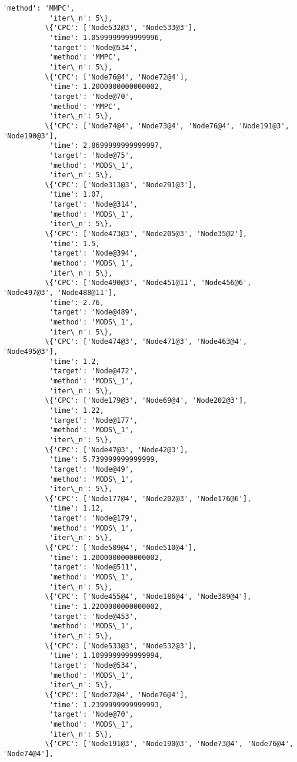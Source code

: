 \documentclass[11pt]{article}
\begin{document}
\begin{Verbatim}[commandchars=\\\{\}]
           'method': 'MMPC',
           'iter\_n': 5\},
          \{'CPC': ['Node532@3', 'Node533@3'],
           'time': 1.0599999999999996,
           'target': 'Node@534',
           'method': 'MMPC',
           'iter\_n': 5\},
          \{'CPC': ['Node76@4', 'Node72@4'],
           'time': 1.2000000000000002,
           'target': 'Node@70',
           'method': 'MMPC',
           'iter\_n': 5\},
          \{'CPC': ['Node74@4', 'Node73@4', 'Node76@4', 'Node191@3', 'Node190@3'],
           'time': 2.8699999999999997,
           'target': 'Node@75',
           'method': 'MODS\_1',
           'iter\_n': 5\},
          \{'CPC': ['Node313@3', 'Node291@3'],
           'time': 1.07,
           'target': 'Node@314',
           'method': 'MODS\_1',
           'iter\_n': 5\},
          \{'CPC': ['Node473@3', 'Node205@3', 'Node35@2'],
           'time': 1.5,
           'target': 'Node@394',
           'method': 'MODS\_1',
           'iter\_n': 5\},
          \{'CPC': ['Node490@3', 'Node451@11', 'Node456@6', 'Node497@3', 'Node488@11'],
           'time': 2.76,
           'target': 'Node@489',
           'method': 'MODS\_1',
           'iter\_n': 5\},
          \{'CPC': ['Node474@3', 'Node471@3', 'Node463@4', 'Node495@3'],
           'time': 1.2,
           'target': 'Node@472',
           'method': 'MODS\_1',
           'iter\_n': 5\},
          \{'CPC': ['Node179@3', 'Node69@4', 'Node202@3'],
           'time': 1.22,
           'target': 'Node@177',
           'method': 'MODS\_1',
           'iter\_n': 5\},
          \{'CPC': ['Node47@3', 'Node42@3'],
           'time': 5.739999999999999,
           'target': 'Node@49',
           'method': 'MODS\_1',
           'iter\_n': 5\},
          \{'CPC': ['Node177@4', 'Node202@3', 'Node176@6'],
           'time': 1.12,
           'target': 'Node@179',
           'method': 'MODS\_1',
           'iter\_n': 5\},
          \{'CPC': ['Node509@4', 'Node510@4'],
           'time': 1.2000000000000002,
           'target': 'Node@511',
           'method': 'MODS\_1',
           'iter\_n': 5\},
          \{'CPC': ['Node455@4', 'Node186@4', 'Node389@4'],
           'time': 1.2200000000000002,
           'target': 'Node@453',
           'method': 'MODS\_1',
           'iter\_n': 5\},
          \{'CPC': ['Node533@3', 'Node532@3'],
           'time': 1.1099999999999994,
           'target': 'Node@534',
           'method': 'MODS\_1',
           'iter\_n': 5\},
          \{'CPC': ['Node72@4', 'Node76@4'],
           'time': 1.2399999999999993,
           'target': 'Node@70',
           'method': 'MODS\_1',
           'iter\_n': 5\},
          \{'CPC': ['Node191@3', 'Node190@3', 'Node73@4', 'Node76@4', 'Node74@4'],

\end{Verbatim}
\end{document}
